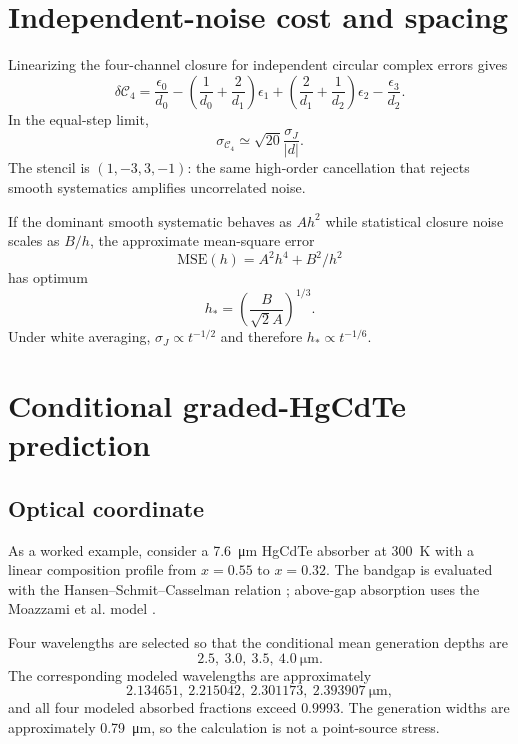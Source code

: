 \documentclass[11pt]{article}
\newcommand{\Cfour}{\mathcal{C}_4}
\begin{document}
\section{Independent-noise cost and spacing}

Linearizing the four-channel closure for independent circular complex errors gives
\begin{equation}
\delta\Cfour
=\frac{\epsilon_0}{d_0}
-\left(\frac1{d_0}+\frac2{d_1}\right)\epsilon_1
+\left(\frac2{d_1}+\frac1{d_2}\right)\epsilon_2
-\frac{\epsilon_3}{d_2}.
\end{equation}
In the equal-step limit,
\begin{equation}
\boxed{
\sigma_{\Cfour}\simeq\sqrt{20}\frac{\sigma_J}{|d|}.}
\label{eq:fournoise}
\end{equation}
The stencil is $(1,-3,3,-1)$: the same high-order cancellation that rejects smooth systematics amplifies uncorrelated noise.

If the dominant smooth systematic behaves as $Ah^2$ while statistical closure noise scales as $B/h$, the approximate mean-square error
\begin{equation}
\mathrm{MSE}(h)=A^2h^4+B^2/h^2
\end{equation}
has optimum
\begin{equation}
\boxed{h_*=\left(\frac{B}{\sqrt2A}\right)^{1/3}.}
\label{eq:hopt}
\end{equation}
Under white averaging, $\sigma_J\propto t^{-1/2}$ and therefore $h_*\propto t^{-1/6}$.

\section{Conditional graded-HgCdTe prediction}

\subsection{Optical coordinate}

As a worked example, consider a \SI{7.6}{\micro\meter} HgCdTe absorber at \SI{300}{K} with a linear composition profile from $x=0.55$ to $x=0.32$. The bandgap is evaluated with the Hansen--Schmit--Casselman relation \cite{Hansen1982}; above-gap absorption uses the Moazzami et al. model \cite{Moazzami2005}.

Four wavelengths are selected so that the conditional mean generation depths are
\begin{equation}
2.5,\ 3.0,\ 3.5,\ 4.0\ \si{\micro\meter}.
\end{equation}
The corresponding modeled wavelengths are approximately
\begin{equation}
2.134651,\ 2.215042,\ 2.301173,\ 2.393907\ \si{\micro\meter},
\end{equation}
and all four modeled absorbed fractions exceed $0.9993$. The generation widths are approximately \SI{0.79}{\micro\meter}, so the calculation is not a point-source stress.
\end{document}
